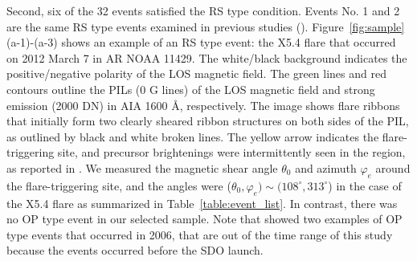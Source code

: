 \documentclass[10pt,preprint2]{aastex}
\begin{document}
Second, six of the 32 events satisfied the RS type condition.
Events No. 1 and 2 are the same RS type events examined in previous studies (\citet{bamba13, bamba14}).
Figure~\ref{fig:sample}(a-1)-(a-3) shows an example of an RS type event: the X5.4 flare that occurred on 2012 March 7 in AR NOAA 11429.
The white/black background indicates the positive/negative polarity of the LOS magnetic field.
The green lines and red contours outline the PILs (0 G lines) of the LOS magnetic field and strong emission (2000 DN) in AIA 1600 {\AA}, respectively.
The image shows flare ribbons that initially form two clearly sheared ribbon structures on both sides of the PIL, as outlined by black and white broken lines.
The yellow arrow indicates the flare-triggering site, and precursor brightenings were intermittently seen in the region, as reported in \citet{bamba13, bamba14}.
We measured the magnetic shear angle $\theta_{0}$ and azimuth $\varphi_{e}$ around the flare-triggering site, and the angles were ($\theta_{0}, \varphi_{e})\sim(108^{\circ}, 313^{\circ}$) in the case of the X5.4 flare as summarized in Table~\ref{table:event_list}.
In contrast, there was no OP type event in our selected sample.
Note that  \citet{bamba13} showed two examples of OP type events that occurred in 2006, that are out of the time range of this study because the events occurred before the SDO launch.
\end{document}
